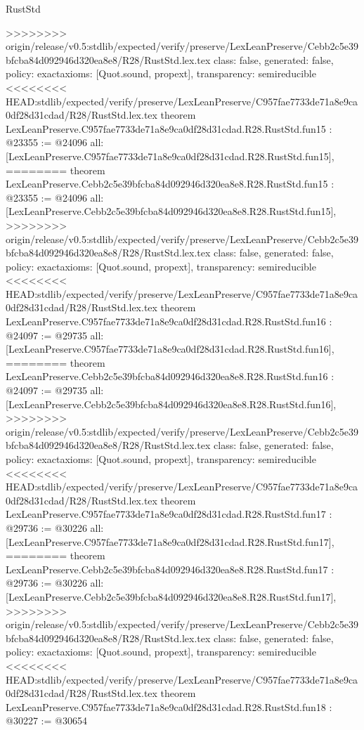 \begin{lexlean}{RustStd}
\begin{coremodule}
{\begin{coremodule}
{{{{{{{{{{{{{{{{{{>>>>>>>> origin/release/v0.5:stdlib/expected/verify/preserve/LexLeanPreserve/Cebb2c5e39bfcba84d092946d320ea8e8/R28/RustStd.lex.tex
  class: false,
  generated: false,
  policy: exact{axioms: [Quot.sound, propext]},
  transparency: semireducible
}
<<<<<<<< HEAD:stdlib/expected/verify/preserve/LexLeanPreserve/C957fae7733de71a8e9ca0df28d31cdad/R28/RustStd.lex.tex
theorem LexLeanPreserve.C957fae7733de71a8e9ca0df28d31cdad.R28.RustStd.fun15 : @23355 := @24096 {
  all: [LexLeanPreserve.C957fae7733de71a8e9ca0df28d31cdad.R28.RustStd.fun15],
========
theorem LexLeanPreserve.Cebb2c5e39bfcba84d092946d320ea8e8.R28.RustStd.fun15 : @23355 := @24096 {
  all: [LexLeanPreserve.Cebb2c5e39bfcba84d092946d320ea8e8.R28.RustStd.fun15],
>>>>>>>> origin/release/v0.5:stdlib/expected/verify/preserve/LexLeanPreserve/Cebb2c5e39bfcba84d092946d320ea8e8/R28/RustStd.lex.tex
  class: false,
  generated: false,
  policy: exact{axioms: [Quot.sound, propext]},
  transparency: semireducible
}
<<<<<<<< HEAD:stdlib/expected/verify/preserve/LexLeanPreserve/C957fae7733de71a8e9ca0df28d31cdad/R28/RustStd.lex.tex
theorem LexLeanPreserve.C957fae7733de71a8e9ca0df28d31cdad.R28.RustStd.fun16 : @24097 := @29735 {
  all: [LexLeanPreserve.C957fae7733de71a8e9ca0df28d31cdad.R28.RustStd.fun16],
========
theorem LexLeanPreserve.Cebb2c5e39bfcba84d092946d320ea8e8.R28.RustStd.fun16 : @24097 := @29735 {
  all: [LexLeanPreserve.Cebb2c5e39bfcba84d092946d320ea8e8.R28.RustStd.fun16],
>>>>>>>> origin/release/v0.5:stdlib/expected/verify/preserve/LexLeanPreserve/Cebb2c5e39bfcba84d092946d320ea8e8/R28/RustStd.lex.tex
  class: false,
  generated: false,
  policy: exact{axioms: [Quot.sound, propext]},
  transparency: semireducible
}
<<<<<<<< HEAD:stdlib/expected/verify/preserve/LexLeanPreserve/C957fae7733de71a8e9ca0df28d31cdad/R28/RustStd.lex.tex
theorem LexLeanPreserve.C957fae7733de71a8e9ca0df28d31cdad.R28.RustStd.fun17 : @29736 := @30226 {
  all: [LexLeanPreserve.C957fae7733de71a8e9ca0df28d31cdad.R28.RustStd.fun17],
========
theorem LexLeanPreserve.Cebb2c5e39bfcba84d092946d320ea8e8.R28.RustStd.fun17 : @29736 := @30226 {
  all: [LexLeanPreserve.Cebb2c5e39bfcba84d092946d320ea8e8.R28.RustStd.fun17],
>>>>>>>> origin/release/v0.5:stdlib/expected/verify/preserve/LexLeanPreserve/Cebb2c5e39bfcba84d092946d320ea8e8/R28/RustStd.lex.tex
  class: false,
  generated: false,
  policy: exact{axioms: [Quot.sound, propext]},
  transparency: semireducible
}
<<<<<<<< HEAD:stdlib/expected/verify/preserve/LexLeanPreserve/C957fae7733de71a8e9ca0df28d31cdad/R28/RustStd.lex.tex
theorem LexLeanPreserve.C957fae7733de71a8e9ca0df28d31cdad.R28.RustStd.fun18 : @30227 := @30654 {
}}}}}}}}}}}}}}}}}}}}}
\end{coremodule}}
\end{coremodule}
\end{lexlean}
